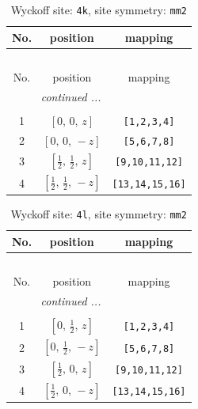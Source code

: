 \documentclass[fleqn,8pt]{jsarticle}
\begin{document}
\renewcommand{\arraystretch}{1.2}
\begin{longtable}{ccc}
\caption{Wyckoff site: {\tt 4k}, site symmetry: {\tt mm2}}
 \\
 \hline \hline
No. & position & mapping \\ \hline \endfirsthead

\multicolumn{2}{l}{\tablename\ \thetable{}} \\
 \hline \hline
No. & position & mapping \\ \hline \endhead

 \hline \hline
\multicolumn{2}{r}{\footnotesize\it continued ...} \\ \endfoot

 \hline \hline
\multicolumn{2}{r}{} \\ \endlastfoot

1 & $\left[ 0,\, 0,\, z \right]$ & {\tt [1,2,3,4]} \\ \hline
2 & $\left[ 0,\, 0,\, - z \right]$ & {\tt [5,6,7,8]} \\ \hline
3 & $\left[ \frac{1}{2},\, \frac{1}{2},\, z \right]$ & {\tt [9,10,11,12]} \\ \hline
4 & $\left[ \frac{1}{2},\, \frac{1}{2},\, - z \right]$ & {\tt [13,14,15,16]} \\
\end{longtable}
\renewcommand{\arraystretch}{1.2}
\begin{longtable}{ccc}
\caption{Wyckoff site: {\tt 4l}, site symmetry: {\tt mm2}}
 \\
 \hline \hline
No. & position & mapping \\ \hline \endfirsthead

\multicolumn{2}{l}{\tablename\ \thetable{}} \\
 \hline \hline
No. & position & mapping \\ \hline \endhead

 \hline \hline
\multicolumn{2}{r}{\footnotesize\it continued ...} \\ \endfoot

 \hline \hline
\multicolumn{2}{r}{} \\ \endlastfoot

1 & $\left[ 0,\, \frac{1}{2},\, z \right]$ & {\tt [1,2,3,4]} \\ \hline
2 & $\left[ 0,\, \frac{1}{2},\, - z \right]$ & {\tt [5,6,7,8]} \\ \hline
3 & $\left[ \frac{1}{2},\, 0,\, z \right]$ & {\tt [9,10,11,12]} \\ \hline
4 & $\left[ \frac{1}{2},\, 0,\, - z \right]$ & {\tt [13,14,15,16]} \\
\end{longtable}
\end{document}

